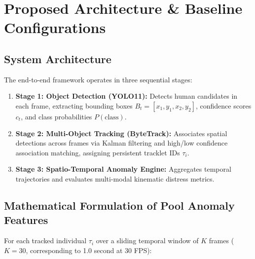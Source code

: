 \documentclass[a4paper,11pt]{article}
\begin{document}
\section{Proposed Architecture \& Baseline Configurations}

\subsection{System Architecture}
The end-to-end framework operates in three sequential stages:
\begin{enumerate}
    \item \textbf{Stage 1: Object Detection (YOLO11):} Detects human candidates in each frame, extracting bounding boxes $B_t = [x_1, y_1, x_2, y_2]$, confidence scores $c_t$, and class probabilities $P(\text{class})$.
    \item \textbf{Stage 2: Multi-Object Tracking (ByteTrack):} Associates spatial detections across frames via Kalman filtering and high/low confidence association matching, assigning persistent tracklet IDs $\tau_i$.
    \item \textbf{Stage 3: Spatio-Temporal Anomaly Engine:} Aggregates temporal trajectories and evaluates multi-modal kinematic distress metrics.
\end{enumerate}

\subsection{Mathematical Formulation of Pool Anomaly Features}
For each tracked individual $\tau_i$ over a sliding temporal window of $K$ frames ($K=30$, corresponding to 1.0 second at 30 FPS):
\end{document}
